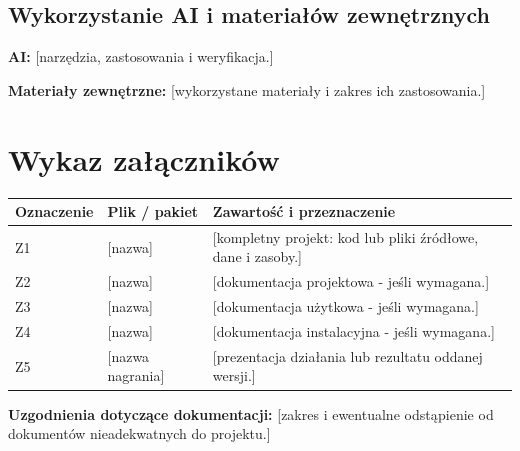 \documentclass[11pt,a4paper,oneside]{article}
\newif\ifpodpowiedzi
\newcommand{\podpowiedz}[1]{\ifpodpowiedzi\par\begingroup\small\color{hintcolor}\textit{Wskazówka: #1}\par\endgroup\fi}
\newcommand{\pole}[1]{\textnormal{[#1]}}
\begin{document}
\subsection{Wykorzystanie AI i materiałów zewnętrznych}
\podpowiedz{Wskaż narzędzia AI i zakres ich zastosowania w całym projekcie. Rozróżnij wspomaganie prac od mechanizmów AI stanowiących część rozwiązania. Opisz weryfikację uzyskanych wyników; dla funkcji AI w projekcie podaj także sposób oceny działania i ograniczenia. Nie wymaga się pełnej historii rozmów ani wszystkich promptów. Jeśli nie korzystano z AI, wpisz tę informację.}
\textbf{AI:} \pole{narzędzia, zastosowania i weryfikacja.}\par
\podpowiedz{Wskaż wykorzystane biblioteki, modele, dane, zasoby i cudze fragmenty kodu, ich pochodzenie i warunki wykorzystania. Odróżnij je od własnego wkładu. Szczegółowe źródła wymień w wykazie na końcu dokumentu.}
\textbf{Materiały zewnętrzne:} \pole{wykorzystane materiały i zakres ich zastosowania.}


\section{Wykaz załączników}
\podpowiedz{Wymień wszystkie oddawane pliki i pakiety wraz z krótkim opisem. Zakres dokumentacji powinien być zgodny z ustaleniami prowadzących. Wskaż kompletny projekt z kodem lub innymi plikami źródłowymi, zasobami i plikami wynikowymi oraz obowiązkowe nagranie. Dokumenty oddaje się w PDF. W razie niewymagania danego rodzaju dokumentacji odnotuj uzgodnienie i uzasadnienie pod tabelą. Dodaj wiersze według potrzeb.}
\begin{tabularx}{\textwidth}{@{}p{} Y Y@{}}
\toprule
Oznaczenie & Plik / pakiet & Zawartość i przeznaczenie\\
\midrule
Z1 & \pole{nazwa} & \pole{kompletny projekt: kod lub pliki źródłowe, dane i zasoby.}\\
Z2 & \pole{nazwa} & \pole{dokumentacja projektowa - jeśli wymagana.}\\
Z3 & \pole{nazwa} & \pole{dokumentacja użytkowa - jeśli wymagana.}\\
Z4 & \pole{nazwa} & \pole{dokumentacja instalacyjna - jeśli wymagana.}\\
Z5 & \pole{nazwa nagrania} & \pole{prezentacja działania lub rezultatu oddanej wersji.}\\
\bottomrule
\end{tabularx}
\textbf{Uzgodnienia dotyczące dokumentacji:} \pole{zakres i ewentualne odstąpienie od dokumentów nieadekwatnych do projektu.}
\end{document}
